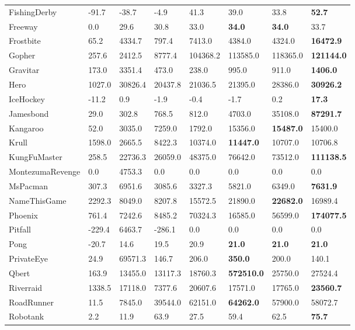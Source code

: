 \documentclass{article}
\begin{document}
\begin{table*}[ht]
\begin{tabular}{l|l|l|l|l|l|l|l}
FishingDerby & -91.7 & -38.7 & -4.9 & 41.3 & 39.0 & 33.8 & \textbf{52.7}\\ 
Freeway & 0.0 & 29.6 & 30.8 & 33.0 & \textbf{34.0} & \textbf{34.0} & 33.7\\ 
Frostbite & 65.2 & 4334.7 & 797.4 & 7413.0 & 4384.0 & 4324.0 & \textbf{16472.9}\\ 
Gopher & 257.6 & 2412.5 & 8777.4 & 104368.2 & 113585.0 & 118365.0 & \textbf{121144.0}\\ 
Gravitar & 173.0 & 3351.4 & 473.0 & 238.0 & 995.0 & 911.0 & \textbf{1406.0}\\ 
Hero & 1027.0 & 30826.4 & 20437.8 & 21036.5 & 21395.0 & 28386.0 & \textbf{30926.2}\\ 
IceHockey & -11.2 & 0.9 & -1.9 & -0.4 & -1.7 & 0.2 & \textbf{17.3}\\ 
Jamesbond & 29.0 & 302.8 & 768.5 & 812.0 & 4703.0 & 35108.0 & \textbf{87291.7}\\ 
Kangaroo & 52.0 & 3035.0 & 7259.0 & 1792.0 & 15356.0 & \textbf{15487.0} & 15400.0\\ 
Krull & 1598.0 & 2665.5 & 8422.3 & 10374.0 & \textbf{11447.0} & 10707.0 & 10706.8\\ 
KungFuMaster & 258.5 & 22736.3 & 26059.0 & 48375.0 & 76642.0 & 73512.0 & \textbf{111138.5}\\ 
MontezumaRevenge & 0.0 & 4753.3 & 0.0 & 0.0 & 0.0 & 0.0 & 0.0\\ 
MsPacman & 307.3 & 6951.6 & 3085.6 & 3327.3 & 5821.0 & 6349.0 & \textbf{7631.9}\\ 
NameThisGame & 2292.3 & 8049.0 & 8207.8 & 15572.5 & 21890.0 & \textbf{22682.0} & 16989.4\\ 
Phoenix & 761.4 & 7242.6 & 8485.2 & 70324.3 & 16585.0 & 56599.0 & \textbf{174077.5}\\ 
Pitfall & -229.4 & 6463.7 & -286.1 & 0.0 & 0.0 & 0.0 & 0.0\\ 
Pong & -20.7 & 14.6 & 19.5 & 20.9 & \textbf{21.0} & \textbf{21.0} & \textbf{21.0}\\ 
PrivateEye & 24.9 & 69571.3 & 146.7 & 206.0 & \textbf{350.0} & 200.0 & 140.1\\ 
Qbert & 163.9 & 13455.0 & 13117.3 & 18760.3 & \textbf{572510.0} & 25750.0 & 27524.4\\ 
Riverraid & 1338.5 & 17118.0 & 7377.6 & 20607.6 & 17571.0 & 17765.0 & \textbf{23560.7}\\ 
RoadRunner & 11.5 & 7845.0 & 39544.0 & 62151.0 & \textbf{64262.0} & 57900.0 & 58072.7\\ 
Robotank & 2.2 & 11.9 & 63.9 & 27.5 & 59.4 & 62.5 & \textbf{75.7}\\ 

\end{tabular}
\end{table*}
\end{document}
